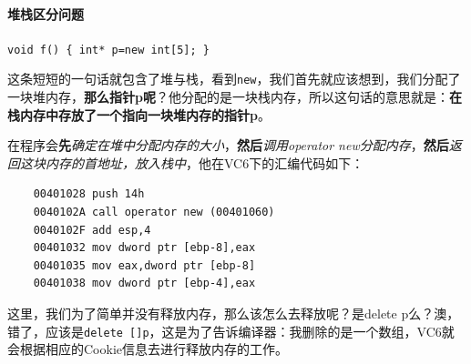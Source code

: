 \documentclass[UTF8,a4paper,12pt]{ctexbook}
\begin{document}
			\paragraph{堆栈区分问题}
				\verb|void f() { int* p=new int[5]; }|
				
				这条短短的一句话就包含了堆与栈，看到\verb|new|，我们首先就应该想到，我们分配了一块堆内存，\textbf{那么指针p呢}？他分配的是一块栈内存，所以这句话的意思就是：\textbf{在栈内存中存放了一个指向一块堆内存的指针p}。
				
				在程序会\textbf{先}\textit{确定在堆中分配内存的大小}，\textbf{然后}\textit{调用operator new分配内存}，\textbf{然后}\textit{返回这块内存的首地址，放入栈中}，他在VC6下的汇编代码如下：
				\begin{lstlisting}
	00401028 push 14h
	0040102A call operator new (00401060)
	0040102F add esp,4
	00401032 mov dword ptr [ebp-8],eax
	00401035 mov eax,dword ptr [ebp-8]
	00401038 mov dword ptr [ebp-4],eax
				\end{lstlisting}
				
				
				这里，我们为了简单并没有释放内存，那么该怎么去释放呢？是delete p么？澳，错了，应该是\verb|delete []p|，这是为了告诉编译器：我删除的是一个数组，VC6就会根据相应的Cookie信息去进行释放内存的工作。
			
\end{document}
